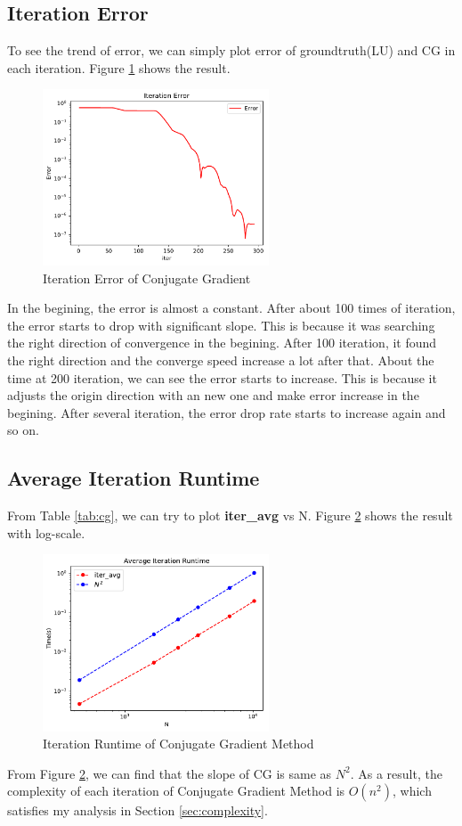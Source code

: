 \documentclass{article}
\begin{document}
\subsection{Iteration Error}
To see the trend of error, we can simply plot error of groundtruth(LU) and CG in each iteration. Figure \ref{fig:iter error} shows the result.
\begin{figure}[H]
	\centering
	\includegraphics[width=0.6\textwidth]{src/iter_error.pdf}
	\caption{Iteration Error of Conjugate Gradient}
	\label{fig:iter error}
\end{figure}
In the begining, the error is almost a constant. After about 100 times of iteration, the error starts to drop with significant slope. This is 
because it was searching the right direction of convergence in the begining. After 100 iteration, it found the right direction and
the converge speed increase a lot after that. About the time at 200 iteration, we can see the error starts to increase. This is because it 
adjusts the origin direction with an new one and make error increase in the begining. After several iteration, the error drop rate starts to
increase again and so on.

\subsection{Average Iteration Runtime}
From Table \ref{tab:cg}, we can try to plot \textbf{iter\_avg} vs N. Figure \ref{fig:complexity} shows the result with log-scale.
\begin{figure}[H]
	\centering
	\includegraphics[width=0.6\textwidth]{src/complexity.pdf}
	\caption{Iteration Runtime of Conjugate Gradient Method}
	\label{fig:complexity}
\end{figure}
From Figure \ref{fig:complexity}, we can find that the slope of CG is same as $N^2$. As a result, the complexity of each iteration of 
Conjugate Gradient Method is $O(n^2)$, which satisfies my analysis in Section \ref{sec:complexity}.
\end{document}
